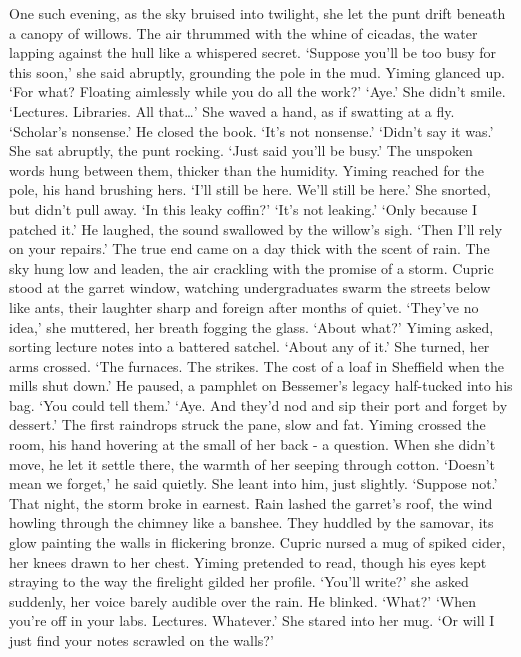 One such evening, as the sky bruised into twilight, she let the punt drift beneath a canopy of willows. The air thrummed with the whine of cicadas, the water lapping against the hull like a whispered secret.
`Suppose you'll be too busy for this soon,' she said abruptly, grounding the pole in the mud.
Yiming glanced up. `For what? Floating aimlessly while you do all the work?'
`Aye.' She didn't smile. `Lectures. Libraries. All that\dots' She waved a hand, as if swatting at a fly. `Scholar's nonsense.'
He closed the book. `It's not nonsense.'
`Didn't say it was.' She sat abruptly, the punt rocking. `Just said you'll be busy.'
The unspoken words hung between them, thicker than the humidity. Yiming reached for the pole, his hand brushing hers. `I'll still be here. We'll still be here.'
She snorted, but didn't pull away. `In this leaky coffin?'
`It's not leaking.'
`Only because I patched it.'
He laughed, the sound swallowed by the willow's sigh. `Then I'll rely on your repairs.'
The true end came on a day thick with the scent of rain. The sky hung low and leaden, the air crackling with the promise of a storm. Cupric stood at the garret window, watching undergraduates swarm the streets below like ants, their laughter sharp and foreign after months of quiet.
`They've no idea,' she muttered, her breath fogging the glass.
`About what?' Yiming asked, sorting lecture notes into a battered satchel.
`About any of it.' She turned, her arms crossed. `The furnaces. The strikes. The cost of a loaf in Sheffield when the mills shut down.'
He paused, a pamphlet on Bessemer's legacy half-tucked into his bag. `You could tell them.'
`Aye. And they'd nod and sip their port and forget by dessert.'
The first raindrops struck the pane, slow and fat. Yiming crossed the room, his hand hovering at the small of her back - a question. When she didn't move, he let it settle there, the warmth of her seeping through cotton.
`Doesn't mean we forget,' he said quietly.
She leant into him, just slightly. `Suppose not.'
That night, the storm broke in earnest. Rain lashed the garret's roof, the wind howling through the chimney like a banshee. They huddled by the samovar, its glow painting the walls in flickering bronze. Cupric nursed a mug of spiked cider, her knees drawn to her chest. Yiming pretended to read, though his eyes kept straying to the way the firelight gilded her profile.
`You'll write?' she asked suddenly, her voice barely audible over the rain.
He blinked. `What?'
`When you're off in your labs. Lectures. Whatever.' She stared into her mug. `Or will I just find your notes scrawled on the walls?'
